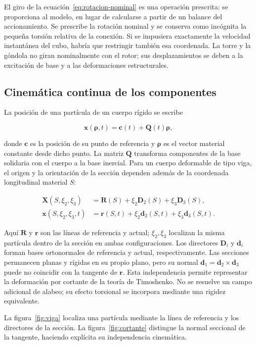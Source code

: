 El giro de la ecuación~\eqref{eq:rotacion-nominal} es una operación prescrita: se proporciona al modelo, en lugar de calcularse a partir de un balance del accionamiento. Se prescribe la rotación nominal y se conserva como incógnita la pequeña torsión relativa de la conexión. Si se impusiera exactamente la velocidad instantánea del cubo, habría que restringir también esa coordenada. La torre y la góndola no giran nominalmente con el rotor; sus desplazamientos se deben a la excitación de base y a las deformaciones estructurales.

\subsection{Cinemática continua de los componentes}
La posición de una partícula de un cuerpo rígido se escribe

\begin{equation}
\bm x(\bm\rho,t)=\bm c(t)+\bm Q(t)\bm\rho,
\label{eq:cuerpo-rigido}
\end{equation}

donde $\bm c$ es la posición de su punto de referencia y $\bm\rho$ es el vector material constante desde dicho punto. La matriz $\bm Q$ transforma componentes de la base solidaria con el cuerpo a la base inercial. Para un cuerpo deformable de tipo viga, el origen y la orientación de la sección dependen además de la coordenada longitudinal material $S$:

\begin{align}
\bm X(S,\xi_2,\xi_3)
&=\bm R(S)+\xi_2\bm D_2(S)+\xi_3\bm D_3(S),\nonumber\\
\bm x(S,\xi_2,\xi_3,t)
&=\bm r(S,t)+\xi_2\bm d_2(S,t)+\xi_3\bm d_3(S,t).
\label{eq:viga-continua}
\end{align}

Aquí $\bm R$ y $\bm r$ son las líneas de referencia y actual; $\xi_2,\xi_3$ localizan la misma partícula dentro de la sección en ambas configuraciones. Los directores $\bm D_i$ y $\bm d_i$ forman bases ortonormales de referencia y actual, respectivamente. Las secciones permanecen planas y rígidas en su propio plano, pero su normal $\bm d_1=\bm d_2\times\bm d_3$ puede no coincidir con la tangente de $\bm r$. Esta independencia permite representar la deformación por cortante de la teoría de Timoshenko. No se resuelve un campo adicional de alabeo; su efecto torsional se incorpora mediante una rigidez equivalente.

La figura~\ref{fig:viga} localiza una partícula mediante la línea de referencia y los directores de la sección. La figura~\ref{fig:cortante} distingue la normal seccional de la tangente, haciendo explícita su independencia cinemática.


